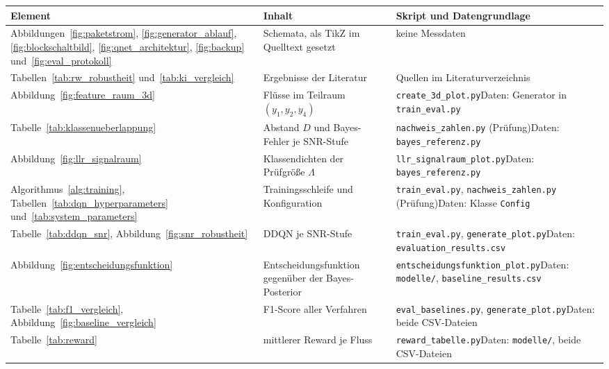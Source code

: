 \begin{tabular}{@{}L{2.8cm}L{4.6cm}L{7.4cm}@{}}
\toprule
\textbf{Element} & \textbf{Inhalt} & \textbf{Skript und Datengrundlage} \\
\midrule
Abbildungen~\ref{fig:paketstrom}, \ref{fig:generator_ablauf}, \ref{fig:blockschaltbild}, \ref{fig:qnet_architektur}, \ref{fig:backup} und~\ref{fig:eval_protokoll} & Schemata, als TikZ im Quelltext gesetzt & keine Messdaten \\
Tabellen~\ref{tab:rw_robustheit} und~\ref{tab:ki_vergleich} & Ergebnisse der Literatur & Quellen im Literaturverzeichnis \\
Abbildung~\ref{fig:feature_raum_3d} & Flüsse im Teilraum $(y_1,y_2,y_4)$ & \texttt{create\_3d\_plot.py}\newline Daten: Generator in \texttt{train\_eval.py} \\
Tabelle~\ref{tab:klassenueberlappung} & Abstand $D$ und Bayes-Fehler je SNR-Stufe & \texttt{nachweis\_zahlen.py} (Prüfung)\newline Daten: \texttt{bayes\_referenz.py} \\
Abbildung~\ref{fig:llr_signalraum} & Klassendichten der Prüfgröße $\Lambda$ & \texttt{llr\_signalraum\_plot.py}\newline Daten: \texttt{bayes\_referenz.py} \\
Algorithmus~\ref{alg:training}, Tabellen~\ref{tab:dqn_hyperparameters} und~\ref{tab:system_parameters} & Trainingsschleife und Konfiguration & \texttt{train\_eval.py}, \texttt{nachweis\_zahlen.py} (Prüfung)\newline Daten: Klasse \texttt{Config} \\
Tabelle~\ref{tab:ddqn_snr}, Abbildung~\ref{fig:snr_robustheit} & DDQN je SNR-Stufe & \texttt{train\_eval.py}, \texttt{generate\_plot.py}\newline Daten: \texttt{evaluation\_results.csv} \\
Abbildung~\ref{fig:entscheidungsfunktion} & Entscheidungsfunktion gegenüber der Bayes-Posterior & \texttt{entscheidungsfunktion\_plot.py}\newline Daten: \texttt{modelle/}, \texttt{baseline\_results.csv} \\
Tabelle~\ref{tab:f1_vergleich}, Abbildung~\ref{fig:baseline_vergleich} & F1-Score aller Verfahren & \texttt{eval\_baselines.py}, \texttt{generate\_plot.py}\newline Daten: beide CSV-Dateien \\
Tabelle~\ref{tab:reward} & mittlerer Reward je Fluss & \texttt{reward\_tabelle.py}\newline Daten: \texttt{modelle/}, beide CSV-Dateien \\

\end{tabular}
